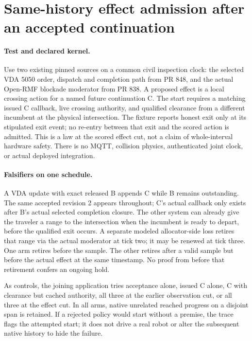\documentclass{article}
\begin{document}
\section*{Same-history effect admission after an accepted continuation}
\paragraph{Test and declared kernel.}
Use two existing pinned sources on a common civil inspection clock:
the selected VDA 5050 order, dispatch and completion path from PR
848, and the actual Open-RMF blockade moderator from PR 838.
A proposed effect is a local crossing action for a named future
continuation C. The start requires a matching issued C callback,
live crossing authority, and qualified clearance from a different
incumbent at the physical intersection. The fixture reports honest
exit only at its stipulated exit event; no re-entry between that
exit and the scored action is admitted. This is a law at the
scored effect cut, not a claim of whole-interval hardware safety.
There is no MQTT, collision physics, authenticated joint clock,
or actual deployed integration.

\paragraph{Falsifiers on one schedule.}
A VDA update with exact released B appends C while B remains
outstanding. The same accepted revision 2 appears throughout;
C's actual callback only exists after B's actual selected
completion closure. The other system can already give the
traveler a range to the intersection when the incumbent is
ready to depart, before the qualified exit occurs. A separate
modeled allocator-side loss retires that range via the actual
moderator at tick two; it may be renewed at tick three.
One arm retires before the sample. The other retires after a
valid sample but before the actual effect at the same timestamp.
No proof from before that retirement confers an ongoing hold.

As controls, the joining application tries acceptance alone,
issued C alone, C with clearance but cached authority,
all three at the earlier observation cut, or all three at the
effect cut. In all arms, native unrelated reached progress
on a disjoint span is retained. If a rejected policy would
start without a premise, the trace flags the attempted start;
it does not drive a real robot or alter the subsequent native
history to hide the failure.
\end{document}
